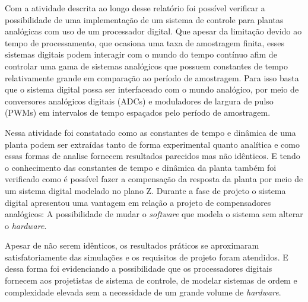 \documentclass[
	article,			%
	11pt,				%
	oneside,			%
	a4paper,			%
	english,			%
	brazil,				%
	sumario=tradicional
	]{abntex2}
\begin{document}
Com a atividade descrita ao longo desse relatório foi possível verificar a possibilidade de uma implementação de um sistema de controle para plantas analógicas com uso de um processador digital.
Que apesar da limitação devido ao tempo de processamento, que ocasiona uma taxa de amostragem finita, esses sistemas digitais podem interagir com o mundo do tempo contínuo afim de controlar uma gama de sistemas analógicos que possuem constantes de tempo relativamente grande em comparação ao período de amostragem.
Para isso basta que o sistema digital possa ser interfaceado com o mundo analógico, por meio de conversores analógicos digitais (ADCs) e moduladores de largura de pulso (PWMs) em intervalos de tempo espaçados pelo período de amostragem.

Nessa atividade foi constatado como as constantes de tempo e dinâmica de uma planta podem ser extraídas tanto de forma experimental quanto analítica e como essas formas de analise fornecem resultados parecidos mas não idênticos.
E tendo o conhecimento das constantes de tempo e dinâmica da planta também foi verificado como é possível fazer a compensação da resposta da planta por meio de um sistema digital modelado no plano Z.
Durante a fase de projeto o sistema digital apresentou uma vantagem em relação a projeto de compensadores analógicos: A possibilidade de mudar o \textit{software} que modela o sistema sem alterar o \textit{hardware}.

Apesar de não serem idênticos, os resultados práticos se aproximaram satisfatoriamente das simulações e os requisitos de projeto foram atendidos.
E dessa forma foi evidenciando a possibilidade que os processadores digitais fornecem aos projetistas de sistema de controle, de modelar sistemas de ordem e complexidade elevada sem a necessidade de um grande volume de \textit{hardware}.
%
%
%
%
\pagebreak

\postextual




%
%
\end{document}
